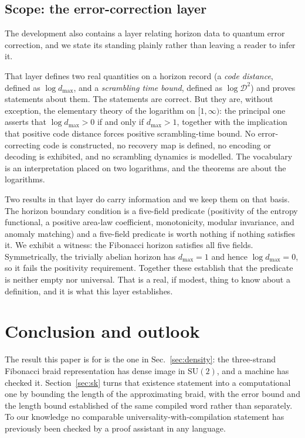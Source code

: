 \documentclass[aps,prx,nofootinbib,superscriptaddress,12pt]{revtex4-2}
\begin{document}
\subsection{Scope: the error-correction layer}

The development also contains a layer relating horizon data to quantum
error correction, and we state its standing plainly rather than leaving
a reader to infer it.

That layer defines two real quantities on a horizon record (a
\emph{code distance}, defined as $\log d_{\max}$, and a \emph{scrambling
time bound}, defined as $\log \mathcal{D}^2$) and proves statements
about them. The statements are correct. But they are, without exception,
the elementary theory of the logarithm on $[1,\infty)$: the principal
one asserts that $\log d_{\max} > 0$ if and only if $d_{\max} > 1$,
together with the implication that positive code distance forces
positive scrambling-time bound. No error-correcting code is constructed,
no recovery map is defined, no encoding or decoding is exhibited, and no
scrambling dynamics is modelled. The vocabulary is an interpretation
placed on two logarithms, and the theorems are about the logarithms.

Two results in that layer do carry information and we keep them on that
basis. The horizon boundary condition is a five-field predicate
 (positivity of the entropy functional, a positive area-law
coefficient, monotonicity, modular invariance, and anomaly matching)
and a five-field predicate is worth nothing if nothing satisfies it. We
exhibit a witness: the Fibonacci horizon satisfies all five fields.
Symmetrically, the trivially abelian horizon has $d_{\max} = 1$ and hence
$\log d_{\max} = 0$, so it fails the positivity requirement. Together
these establish that the predicate is neither empty nor universal. That
is a real, if modest, thing to know about a definition, and it is what
this layer establishes.

\section{Conclusion and outlook}
\label{sec:open}

The result this paper is for is the one in Sec.~\ref{sec:density}: the
three-strand Fibonacci braid representation has dense image in
$\mathrm{SU}(2)$, and a machine has checked it. Section~\ref{sec:sk}
turns that existence statement into a computational one by bounding the
length of the approximating braid, with the error bound and the length
bound established of the same compiled word rather than separately. To
our knowledge no comparable universality-with-compilation statement has
previously been checked by a proof assistant in any language.
\end{document}
